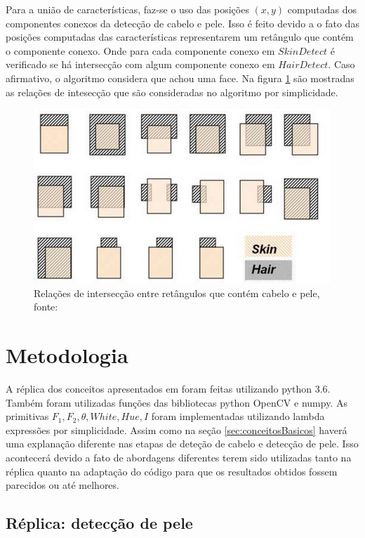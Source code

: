 \documentclass[journal,onecolumn]{IEEEtran}
\begin{document}
	Para a união de características, faz-se o uso das posições $(x,y)$ computadas dos componentes conexos da detecção de cabelo e pele.
	Isso é feito devido a o fato das posições computadas das características representarem um retângulo que contém o componente conexo.
	Onde para cada componente conexo em $SkinDetect$ é verificado se há intersecção com algum componente conexo em $HairDetect$.
	Caso afirmativo, o algoritmo considera que achou uma face.
	Na figura \ref{fig:intesectRelations} são mostradas as relações de intesecção que são consideradas no algoritmo por simplicidade.
	\begin{figure}[htp]
	\begin{center}
		\includegraphics[scale=0.3]{intersections_skin_hair_components.png}
		\caption{Relações de intersecção entre retângulos que contém cabelo e pele, fonte:\cite{chen2007simple} }			\label{fig:intesectRelations}
	\end{center}
	\end{figure}
	
	\section{Metodologia}
	\label{sec:metodologia}
	
	A réplica dos conceitos apresentados em \cite{chen2007simple} foram feitas utilizando python 3.6.
	Também foram utilizadas funções das bibliotecas python OpenCV e numpy.
	As primitivas $F_1,F_2,\theta,White,Hue,I$  foram implementadas utilizando lambda expressões por simplicidade.
	Assim como na seção \ref{sec:conceitosBasicos} haverá uma explanação diferente nas etapas de deteção de cabelo e detecção de pele. 
	Isso acontecerá devido a fato de abordagens diferentes terem sido utilizadas tanto na réplica quanto na adaptação do código para que os resultados obtidos fossem parecidos ou até melhores.
	
	\subsection{Réplica: detecção de pele}
	
\end{document}
